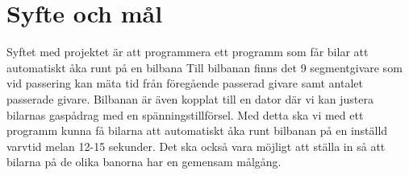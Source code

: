 \section{Syfte och mål}
Syftet med projektet är att programmera ett programm som får bilar att automatiskt åka runt på en bilbana
Till bilbanan finns det 9 segmentgivare som vid passering kan mäta tid från föregående passerad givare samt antalet passerade givare.
Bilbanan är även kopplat till en dator där vi kan justera bilarnas gaspådrag med en spänningstillförsel.
Med detta ska vi med ett programm kunna få bilarna att automatiskt åka runt bilbanan på en inställd varvtid melan 12-15 sekunder.
Det ska också vara möjligt att ställa in så att bilarna på de olika banorna har en gemensam målgång.
